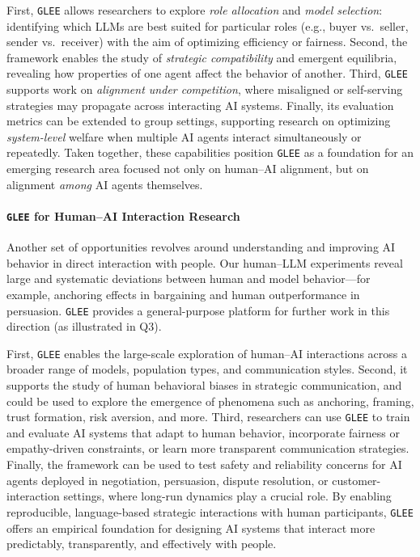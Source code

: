 First, \texttt{GLEE} allows researchers to explore \emph{role allocation} and \emph{model selection}: identifying 
which LLMs are best suited for particular roles (e.g., buyer vs.\ seller, sender vs.\ receiver) with the aim of 
optimizing efficiency or fairness. Second, the framework enables the study of \emph{strategic 
compatibility} and emergent equilibria, revealing how properties of one agent affect the behavior of 
another. Third, \texttt{GLEE} supports work on \emph{alignment under competition}, where misaligned or 
self-serving strategies may propagate across interacting AI systems. Finally, its evaluation metrics can be 
extended to group settings, supporting research on optimizing \emph{system-level} welfare when multiple AI agents 
interact simultaneously or repeatedly.
Taken together, these capabilities position \texttt{GLEE} as a foundation for an emerging research area focused 
not only on human--AI alignment, but on alignment \emph{among} AI agents themselves.

\paragraph{\texttt{GLEE} for Human--AI Interaction Research}
Another set of opportunities revolves around understanding and improving AI behavior in direct interaction with 
people. Our human--LLM experiments reveal large and systematic deviations between human and model behavior---for 
example, anchoring effects in bargaining and human outperformance in persuasion. \texttt{GLEE} provides a 
general-purpose platform for further work in this direction (as illustrated in Q3).

First, \texttt{GLEE} enables the large-scale exploration of human--AI interactions across a broader range of 
models, population types, and communication styles. Second, it supports the study of human behavioral biases in 
strategic communication, and could be used to explore the emergence of phenomena such as anchoring, framing, trust formation, risk aversion, and more. Third, researchers can 
use \texttt{GLEE} to train and evaluate AI systems that adapt to human behavior, incorporate fairness or 
empathy-driven constraints, or learn more transparent communication strategies. Finally, the framework can be 
used to test safety and reliability concerns for AI agents deployed in negotiation, persuasion, dispute 
resolution, or customer-interaction settings, where long-run dynamics play a crucial role.
By enabling reproducible, language-based strategic interactions with human participants, \texttt{GLEE} offers an 
empirical foundation for designing AI systems that interact more predictably, transparently, and effectively with 
people.

